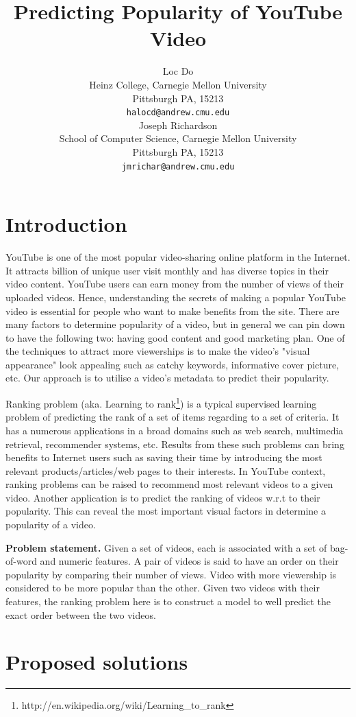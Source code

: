 \documentclass{article} %
\title{Predicting Popularity of YouTube Video}
\author{
Loc Do \\
Heinz College,
Carnegie Mellon University \\
Pittsburgh PA, 15213\\
\texttt{halocd@andrew.cmu.edu} \\
\And
Joseph Richardson \\
School of Computer Science,
Carnegie Mellon University \\
Pittsburgh PA, 15213 \\
\texttt{jmrichar@andrew.cmu.edu} \\
}
\begin{document}
\maketitle

\section{Introduction}
\label{sec:intro}
YouTube is one of the most popular video-sharing online platform in the Internet. It attracts billion of unique user visit monthly and has diverse topics in their video content. YouTube users can earn money from the number of views of their uploaded videos. Hence, understanding the secrets of making a popular YouTube video is essential for people who want to make benefits from the site. There are many factors to determine popularity of a video, but in general we can pin down to have the following two: having good content and good marketing plan. One of the techniques to attract more viewerships is to make the video's "visual appearance" look appealing such as catchy keywords, informative cover picture, etc. Our approach is to utilise a video's metadata to predict their popularity.

Ranking problem (aka. Learning to rank\footnote{http://en.wikipedia.org/wiki/Learning\_to\_rank}) is a typical supervised learning problem of predicting the rank of a set of items regarding to a set of criteria. It has a numerous applications in a broad domains such as web search, multimedia retrieval, recommender systems, etc. Results from these such problems can bring benefits to Internet users such as saving their time by introducing the most relevant products/articles/web pages to their interests. In YouTube context, ranking problems can be raised to recommend most relevant videos to a given video. Another application is to predict the ranking of videos w.r.t to their popularity. This can reveal the most important visual factors in determine a popularity of a video.

\textbf{Problem statement.} Given a set of videos, each is associated with a set of bag-of-word and numeric features. A pair of videos is said to have an order on their popularity by comparing their number of views. Video with more viewership is considered to be more popular than the other. Given two videos with their features, the ranking problem here is to construct a model to well predict the exact order between the two videos.

\section{Proposed solutions}
\label{sec:solution}
\end{document}
